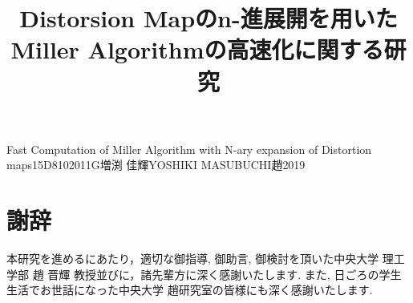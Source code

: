 \documentclass[a4j,oneside,openany]{jsbook}
\begin{document}

\title{Distorsion Mapのn-進展開を用いた　Miller Algorithmの高速化に関する研究}{Fast Computation of Miller Algorithm with N-ary expansion of Distortion maps}{15D8102011G}{増渕 佳輝}{YOSHIKI MASUBUCHI}{趙}{2019}

\setcounter{page}{1}


\newpage

\tableofcontents
\newpage











\chapter*{謝辞}
本研究を進めるにあたり，適切な御指導, 御助言, 御検討を頂いた中央大学 理工学部 趙 晋輝 教授並びに，諸先輩方に深く感謝いたします. また, 日ごろの学生生活でお世話になった中央大学 趙研究室の皆様にも深く感謝いたします.
\end{document}
